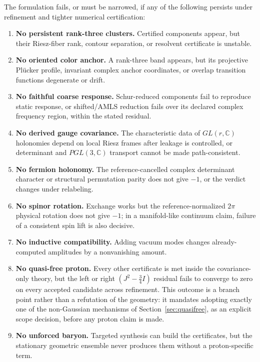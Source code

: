 \documentclass[11pt,letterpaper]{article}
\begin{document}
The formulation fails, or must be narrowed, if any of the following persists
under refinement and tighter numerical certification:
\begin{enumerate}
  \item \textbf{No persistent rank-three clusters.} Certified components
    appear, but their Riesz-fiber rank, contour separation, or resolvent
    certificate is unstable.
  \item \textbf{No oriented color anchor.} A rank-three band appears, but its
    projective Pl\"ucker profile, invariant complex anchor coordinates, or
    overlap transition functions degenerate or drift.
  \item \textbf{No faithful coarse response.} Schur-reduced components fail to
    reproduce static response, or shifted/AMLS reduction fails over its
    declared complex frequency region, within the stated residual.
  \item \textbf{No derived gauge covariance.} The characteristic data of
    $GL(r,\mathbb C)$ holonomies depend on local Riesz frames after leakage is
    controlled, or determinant and $PGL(3,\mathbb C)$ transport cannot be made
    path-consistent.
  \item \textbf{No fermion holonomy.} The reference-cancelled complex
    determinant character or structural permutation parity does not give
    $-1$, or the verdict
    changes under relabeling.
  \item \textbf{No spinor rotation.} Exchange works but the
    reference-normalized $2\pi$ physical rotation does not give $-1$; in
    a manifold-like continuum claim, failure of a consistent spin lift is also
    decisive.
  \item \textbf{No inductive compatibility.} Adding vacuum modes changes
    already-computed amplitudes by a nonvanishing amount.
  \item \textbf{No quasi-free proton.} Every other certificate is met inside
    the covariance-only theory, but the left or right
    $(J^2-\tfrac34 I)$ residual fails to converge to zero on every accepted
    candidate across refinement. This
    outcome is a branch point rather than a refutation of the geometry: it
    mandates adopting exactly one of the non-Gaussian mechanisms of
    Section~\ref{sec:quasifree}, as an explicit scope decision, before any
    proton claim is made.
  \item \textbf{No unforced baryon.} Targeted synthesis can build the
    certificates, but the stationary geometric ensemble never produces them
    without a proton-specific term.

\end{enumerate}
\end{document}
